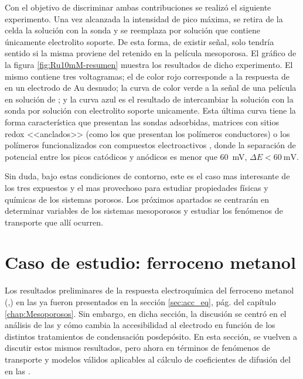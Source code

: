 		Con el objetivo de discriminar ambas contribuciones se realizó el siguiente experimento. Una vez alcanzada la intensidad de pico máxima, se retira de la celda la solución con la sonda y se reemplaza por solución que contiene únicamente electrolito soporte. De esta forma, de existir señal, solo tendría sentido si la misma proviene del \ru\space retenido en la película mesoporosa. El gráfico de la figura \ref{fig:Ru10mM-resumen} muestra los resultados de dicho experimento. El mismo contiene tres voltagramas; el de color rojo corresponde a la respuesta de \ru\space en un electrodo de Au desnudo; la curva de color verde a la señal de una película en solución de \ru; y la curva azul es el resultado de intercambiar la solución con la sonda por solución con electrolito soporte unicamente. Esta última curva tiene la forma característica que presentan las sondas adsorbidas, matrices con sitios redox <<anclados>>\cite{Ybarra2005} (como los que presentan los polímeros conductores) o los polímeros funcionalizados con compuestos electroactivos \cite{Rohlfing2005,Vila2015}, donde la separación de potencial entre los picos catódicos y anódicos es menor que \SI{60}{\milli\volt}, $\Delta E < \SI{60}{\milli\volt}$\cite{Wi2000}.

		Sin duda, bajo estas condiciones de contorno, este es el caso mas interesante de los tres expuestos y el mas provechoso para estudiar propiedades físicas y químicas de los sistemas porosos. Los próximos apartados se centrarán en determinar variables de los sistemas mesoporosos y estudiar los fenómenos de transporte que allí ocurren.

\section{Caso de estudio: ferroceno metanol}\label{sec:difusion}

	 Los resultados preliminares de la respuesta electroquímica del ferroceno metanol (\ferroceno,\fc) en las \pdmF\space ya fueron presentados en la sección \ref{sec:acc_eq}, pág. \pageref{sec:acc_eq} del capítulo \ref{chap:Mesoporosos}. Sin embargo, en dicha sección, la discusión se centró en el análisis de las \pdm\space y cómo cambia la accesibilidad al electrodo en función de los distintos tratamientos de condensación posdepósito.
	 En esta sección, se vuelven a discutir estos mismos resultados, pero ahora en términos de fenómenos de transporte y modelos válidos aplicables al cálculo de coeficientes de difusión del \fc\space en las \pdm.

